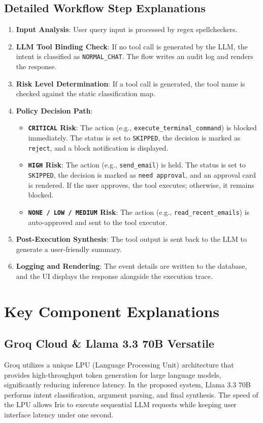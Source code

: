 \documentclass{article}
\begin{document}
\subsection{Detailed Workflow Step Explanations}
\begin{enumerate}
    \item \textbf{Input Analysis}: User query input is processed by regex spellcheckers.
    \item \textbf{LLM Tool Binding Check}: If no tool call is generated by the LLM, the intent is classified as \texttt{NORMAL\_CHAT}. The flow writes an audit log and renders the response.
    \item \textbf{Risk Level Determination}: If a tool call is generated, the tool name is checked against the static classification map.
    \item \textbf{Policy Decision Path}:
    \begin{itemize}
        \item \textbf{\texttt{CRITICAL} Risk}: The action (e.g., \texttt{execute\_terminal\_command}) is blocked immediately. The status is set to \texttt{SKIPPED}, the decision is marked as \texttt{reject}, and a block notification is displayed.
        \item \textbf{\texttt{HIGH} Risk}: The action (e.g., \texttt{send\_email}) is held. The status is set to \texttt{SKIPPED}, the decision is marked as \texttt{need approval}, and an approval card is rendered. If the user approves, the tool executes; otherwise, it remains blocked.
        \item \textbf{\texttt{NONE / LOW / MEDIUM} Risk}: The action (e.g., \texttt{read\_recent\_emails}) is auto-approved and sent to the tool executor.
    \end{itemize}
    \item \textbf{Post-Execution Synthesis}: The tool output is sent back to the LLM to generate a user-friendly summary.
    \item \textbf{Logging and Rendering}: The event details are written to the database, and the UI displays the response alongside the execution trace.
\end{enumerate}

\section{Key Component Explanations}

\subsection{Groq Cloud \& Llama 3.3 70B Versatile}
Groq utilizes a unique LPU (Language Processing Unit) architecture that provides high-throughput token generation for large language models, significantly reducing inference latency. In the proposed system, Llama 3.3 70B performs intent classification, argument parsing, and final synthesis. The speed of the LPU allows Iris to execute sequential LLM requests while keeping user interface latency under one second.
\end{document}
